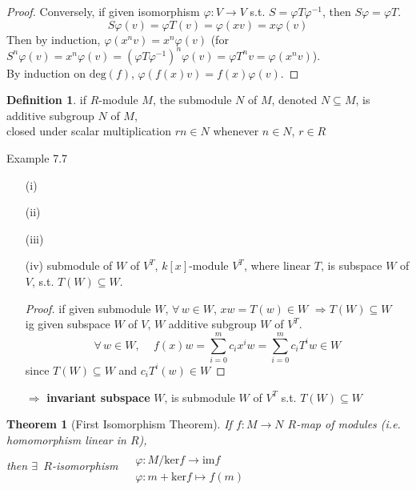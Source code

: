 \documentclass[twoside,landscape]{amsart}
\theoremstyle{plain}
\newtheorem{theorem}{Theorem}
\theoremstyle{definition}
\newtheorem{definition}{Definition}
\theoremstyle{remark}
\begin{document}
\begin{multicols*}{2}
\begin{proof}
Conversely, if given isomorphism $\varphi: V \to V$ s.t. $S = \varphi T \varphi^{-1}$, then $S\varphi = \varphi T$.  
\[
S\varphi(v) = \varphi T(v) = \varphi(xv) = x\varphi(v)
\]
Then by induction, $\varphi(x^nv) = x^n\varphi(v)$ (for $S^n\varphi(v) = x^n\varphi(v) = (\varphi T \varphi^{-1})^n \varphi(v) = \varphi T^n v = \varphi(x^nv)$).  \\
By induction on $\text{deg}(f)$, $\varphi(f(x)v) = f(x)\varphi(v)$.  


\end{proof}

\begin{definition}
  if $R$-module $M$, the submodule $N$ of $M$, denoted $N\subseteq M$, is additive subgroup $N$ of $M$, \\
closed under scalar multiplication $rn \in N$ whenever $n\in N$, $r\in R$
\end{definition}

Example 7.7 
\begin{enumerate}
  \item[(i)]
  \item[(ii)]
  \item[(iii)]
  \item[(iv)] submodule of $W$ of $V^T$, $k[x]$-module $V^T$, where linear $T$, is subspace $W$ of $V$, s.t. $T(W) \subseteq W$.  

\begin{proof}
  if given submodule $W$, $\forall \, w \in W$, $xw = T(w) \in W$ $\Longrightarrow T(W) \subseteq W$ \\
ig given subspace $W$ of $V$, $W$ additive subgroup $W$ of $V^T$.  
\[
\forall \, w \in W , \quad \, f(x)w = \sum_{i=0}^m c_ix^iw = \sum_{i=0}^m c_iT^iw \in W
\]
since $T(W) \subseteq W$ and $c_iT^i(w) \in W$
\end{proof}
$\Longrightarrow $ \textbf{invariant subspace } $W$, is submodule $W$ of $V^T$ s.t. $T(W) \subseteq W$
\end{enumerate}


\begin{theorem}[First Isomorphism Theorem]
  If $f:M\to N$ $R$-map of modules (i.e. homomorphism linear in $R$), \\
then $\exists \, $ $R$-isomorphism $\begin{aligned} & \quad \\
  & \varphi : M / \text{ker}{f} \to \text{im}{f} \\
  & \varphi : m + \text{ker}{f} \mapsto f(m) \end{aligned}$



\end{theorem}
\end{multicols*}
\end{document}
